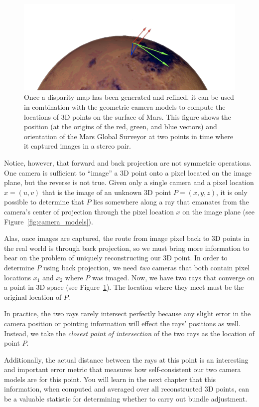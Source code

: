 \begin{figure}[tb]
  \centering
  \includegraphics[width=12cm]{images/correlation/triangulation}
  \caption{Once a disparity map has been generated and refined, it can
    be used in combination with the geometric camera models to compute
    the locations of 3D points on the surface of Mars.  This figure
    shows the position (at the origins of the red, green, and blue vectors) and 
	orientation of the Mars Global Surveyor at
    two points in time where it captured images in a stereo pair.}
  \label{fig:triangulation}
\end{figure}

Notice, however, that forward and back projection are not symmetric
operations.  One camera is sufficient to ``image'' a 3D point onto a
pixel located on the image plane, but the reverse is not true.  Given
only a single camera and a pixel location $x = (u,v)$ that is the
image of an unknown 3D point $P = (x,y,z)$, it is only possible to
determine that $P$ lies somewhere along a ray that emanates from the
camera's center of projection through the pixel location $x$ on the
image plane (see Figure~\ref{fig:camera_models}).

Alas, once images are captured, the route from image pixel back to 3D
points in the real world is through back projection, so we must bring
more information to bear on the problem of uniquely reconstructing our
3D point.  In order to determine $P$ using back projection, we need
{\em two} cameras that both contain pixel locations $x_1$ and $x_2$
where $P$ was imaged.  Now, we have two rays that converge on a point
in 3D space (see Figure~\ref{fig:triangulation}). The location where
they meet must be the original location of $P$.

In practice, the two rays rarely intersect perfectly because any
slight error in the camera position or pointing information will
effect the rays' positions as well.  Instead, we take the {\em closest
  point of intersection} of the two rays as the location of point $P$.

Additionally, the actual distance between the rays at this point is an
interesting and important error metric that measures how
self-consistent our two camera models are for this point.  You will
learn in the next chapter that this information, when computed and
averaged over all reconstructed 3D points, can be a valuable statistic for
determining whether to carry out bundle adjustment.
